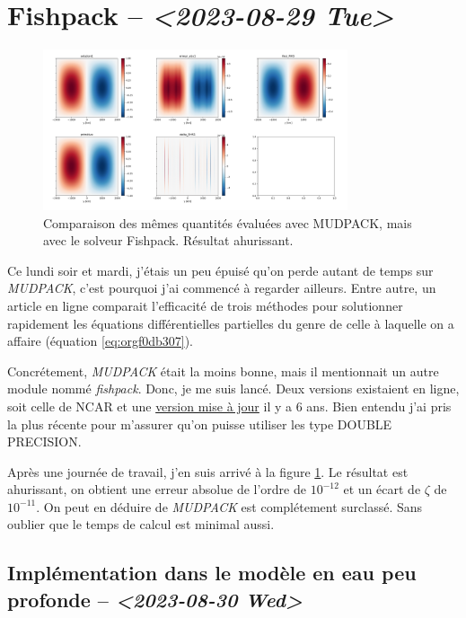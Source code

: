 \documentclass[10pt]{article}
\numberwithin{equation}{section}
\begin{document}
\section{Fishpack -- \textit{<2023-08-29 Tue>}}
\label{sec:orgd153962}

\begin{figure}[!htpb]
\centering
\includegraphics[width=0.8\textwidth]{figures/fishpack/2023-08-29-fishtest.png}
\caption{\label{fig:orga06aeee}Comparaison des mêmes quantités évaluées avec MUDPACK, mais avec le solveur Fishpack. Résultat ahurissant.}
\end{figure}

Ce lundi soir et mardi, j'étais un peu épuisé qu'on perde autant de temps sur \emph{MUDPACK}, c'est pourquoi j'ai commencé à regarder ailleurs.
Entre autre, un article en ligne comparait l'efficacité de trois méthodes pour solutionner rapidement les équations différentielles partielles du genre de celle à laquelle on a affaire (équation \ref{eq:orgf0db307}).\bigskip

Concrétement, \emph{MUDPACK} était la moins bonne, mais il mentionnait un autre module nommé \emph{fishpack}.
Donc, je me suis lancé.
Deux versions existaient en ligne, soit celle de NCAR et une \href{https://github.com/jlokimlin/fishpack}{version mise à jour} il y a 6 ans.
Bien entendu j'ai pris la plus récente pour m'assurer qu'on puisse utiliser les type DOUBLE PRECISION.\bigskip

Après une journée de travail, j'en suis arrivé à la figure \ref{fig:orga06aeee}.
Le résultat est ahurissant, on obtient une erreur absolue de l'ordre de \(10^{-12}\) et un écart de \(\zeta\) de \(10^{-11}\).
On peut en déduire de \emph{MUDPACK} est complétement surclassé.
Sans oublier que le temps de calcul est minimal aussi.

\subsection{Implémentation dans le modèle en eau peu profonde -- \textit{<2023-08-30 Wed>}}
\label{sec:org822c1da}
\end{document}
